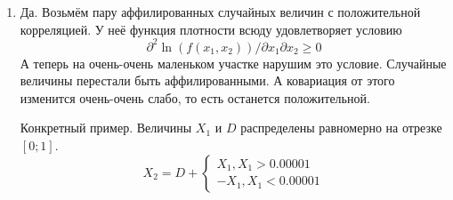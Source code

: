 \begin{enumerate}
\item Да. Возьмём пару аффилированных случайных величин с положительной  корреляцией. У неё функция плотности всюду удовлетворяет условию
\begin{equation}
\partial^{2}\ln (f(x_{1},x_{2}))/\partial x_{1}\partial x_{2} \geq 0
\end{equation}
А теперь на очень-очень маленьком участке нарушим это условие. Случайные величины перестали быть аффилированными. А ковариация от этого изменится очень-очень слабо, то есть останется положительной.

Конкретный пример. Величины $ X_{1} $  и $D$ распределены  равномерно на отрезке $ [0;1] $.
\begin{equation}
X_{2}=D+
\begin{cases}
X_{1}, X_{1}>0.00001 \\
-X_{1}, X_{1}<0.00001
\end{cases}
\end{equation}


\end{enumerate}
